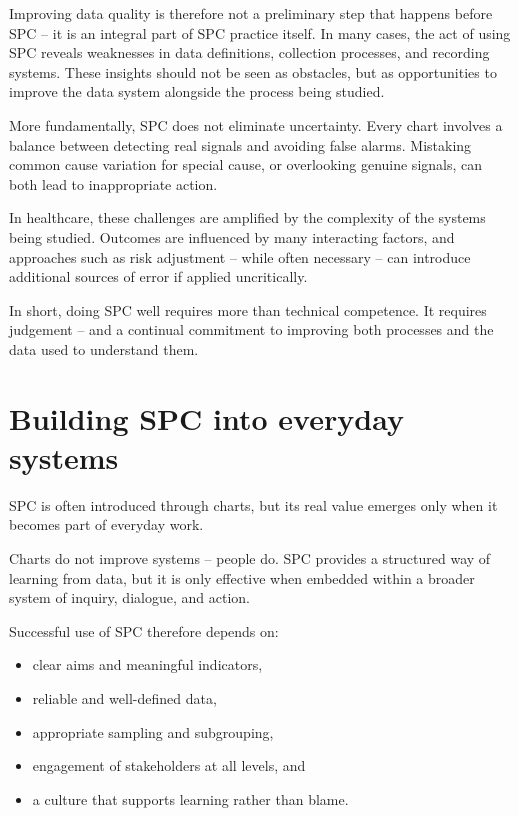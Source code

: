 \documentclass[
]{book}
\providecommand{\tightlist}{%
  \setlength{\itemsep}{0pt}\setlength{\parskip}{0pt}}
\begin{document}
Improving data quality is therefore not a preliminary step that happens
before SPC -- it is an integral part of SPC practice itself. In many
cases, the act of using SPC reveals weaknesses in data definitions,
collection processes, and recording systems. These insights should not
be seen as obstacles, but as opportunities to improve the data system
alongside the process being studied.

More fundamentally, SPC does not eliminate uncertainty. Every chart
involves a balance between detecting real signals and avoiding false
alarms. Mistaking common cause variation for special cause, or
overlooking genuine signals, can both lead to inappropriate action.

In healthcare, these challenges are amplified by the complexity of the
systems being studied. Outcomes are influenced by many interacting
factors, and approaches such as risk adjustment -- while often necessary
-- can introduce additional sources of error if applied uncritically.

In short, doing SPC well requires more than technical competence. It
requires judgement -- and a continual commitment to improving both
processes and the data used to understand them.

\section{Building SPC into everyday
systems}\label{building-spc-into-everyday-systems}

SPC is often introduced through charts, but its real value emerges only
when it becomes part of everyday work.

Charts do not improve systems -- people do. SPC provides a structured
way of learning from data, but it is only effective when embedded within
a broader system of inquiry, dialogue, and action.

Successful use of SPC therefore depends on:

\begin{itemize}
\tightlist
\item
  clear aims and meaningful indicators,
\item
  reliable and well-defined data,
\item
  appropriate sampling and subgrouping,
\item
  engagement of stakeholders at all levels, and
\item
  a culture that supports learning rather than blame.
\end{itemize}
\end{document}
